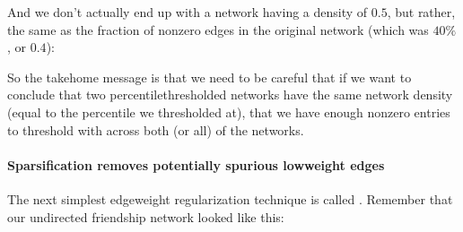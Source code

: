 \documentclass[letterpaper,10pt,english]{jupyterBook}
\begin{document}
\begin{sphinxVerbatim}[commandchars=\\\{\}]
  \PYG{p}{[} \PYG{p}{]}   
    

\PYG{p}{[}  \PYG{p}{]}  
\PYG{p}{[}  \PYG{p}{]}  
\end{sphinxVerbatim}

\sphinxAtStartPar
And we don’t actually end up with a network having a density of \(0.5\), but rather, the same as the fraction of non\sphinxhyphen{}zero edges in the original network (which was \(40\%\), or \(0.4\)):

\begin{sphinxVerbatim}[commandchars=\\\{\}]
  
\end{sphinxVerbatim}

\sphinxAtStartPar
So the take\sphinxhyphen{}home message is that we need to be careful that if we want to conclude that two percentile\sphinxhyphen{}thresholded networks have the same network density (equal to the percentile we thresholded at), that we have enough non\sphinxhyphen{}zero entries to threshold with across both (or all) of the networks.


\paragraph{Sparsification removes potentially spurious low\sphinxhyphen{}weight edges}
\label{\detokenize{representations/ch4/regularization:sparsification-removes-potentially-spurious-low-weight-edges}}
\sphinxAtStartPar
The next simplest edge\sphinxhyphen{}weight regularization technique is called . Remember that our undirected friendship network looked like this:
\end{document}
